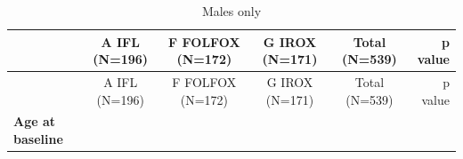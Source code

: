 \documentclass[
]{book}
\begin{document}
\begin{longtable}[]{@{}lccccr@{}}
\caption{Males only}\tabularnewline
\toprule
\begin{minipage}[b]{0.20\columnwidth}\raggedright
\strut
\end{minipage} & \begin{minipage}[b]{0.15\columnwidth}\centering
A IFL (N=196)\strut
\end{minipage} & \begin{minipage}[b]{0.15\columnwidth}\centering
F FOLFOX (N=172)\strut
\end{minipage} & \begin{minipage}[b]{0.15\columnwidth}\centering
G IROX (N=171)\strut
\end{minipage} & \begin{minipage}[b]{0.15\columnwidth}\centering
Total (N=539)\strut
\end{minipage} & \begin{minipage}[b]{0.05\columnwidth}\raggedleft
p value\strut
\end{minipage}\tabularnewline
\midrule
\endfirsthead
\toprule
\begin{minipage}[b]{0.20\columnwidth}\raggedright
\strut
\end{minipage} & \begin{minipage}[b]{0.15\columnwidth}\centering
A IFL (N=196)\strut
\end{minipage} & \begin{minipage}[b]{0.15\columnwidth}\centering
F FOLFOX (N=172)\strut
\end{minipage} & \begin{minipage}[b]{0.15\columnwidth}\centering
G IROX (N=171)\strut
\end{minipage} & \begin{minipage}[b]{0.15\columnwidth}\centering
Total (N=539)\strut
\end{minipage} & \begin{minipage}[b]{0.05\columnwidth}\raggedleft
p value\strut
\end{minipage}\tabularnewline
\midrule
\endhead
\begin{minipage}[t]{0.20\columnwidth}\raggedright
\textbf{Age at baseline}\strut
\end{minipage} & \begin{minipage}[t]{0.15\columnwidth}\centering
\strut
\end{minipage} & \begin{minipage}[t]{0.15\columnwidth}\centering
\strut
\end{minipage} & \begin{minipage}[t]{0.15\columnwidth}\centering

\end{minipage}
\end{longtable}
\end{document}
